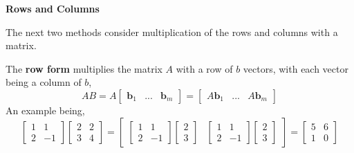             \par \hfill \break
            \textbf{Rows and Columns}
            \par \hfill \break
            The next two methods consider multiplication of the rows and columns with a matrix.
            \par \hfill \break
            The \textbf{row form} multiplies the matrix \(A\) with a row of \(b\) vectors, with each vector being a
            column of \(b\),
            \begin{equation}
                AB = A
                \begin{bmatrix}
                    \boldsymbol{b}_1 & ... & \boldsymbol{b}_m
                \end{bmatrix}
                =
                \begin{bmatrix}
                    A\boldsymbol{b}_1 & ... & A\boldsymbol{b}_m
                \end{bmatrix}
            \end{equation}
            An example being, 
            \begin{equation}
                \begin{bmatrix}
                    1 & 1 \\
                    2 & -1
                \end{bmatrix}
                \begin{bmatrix}
                    2 & 2 \\
                    3 & 4
                \end{bmatrix}
                =
                \begin{bmatrix}
                    \begin{bmatrix}
                        1 & 1 \\
                        2 & -1
                    \end{bmatrix}
                    \begin{bmatrix}
                        2 \\
                        3
                    \end{bmatrix}
                    &
                    \begin{bmatrix}
                        1 & 1 \\
                        2 & -1
                    \end{bmatrix}
                    \begin{bmatrix}
                        2 \\
                        3
                    \end{bmatrix}
                \end{bmatrix}
                =
                \begin{bmatrix}
                    5 & 6 \\
                    1 & 0
                \end{bmatrix}
            \end{equation}
